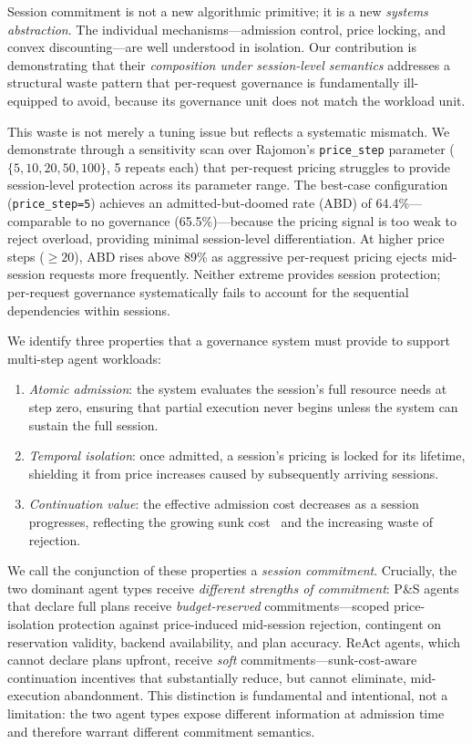\documentclass[sigconf,review,anonymous]{acmart}
\begin{document}
Session commitment is not a new algorithmic primitive; it is a new \emph{systems abstraction}. The individual mechanisms---admission control, price locking, and convex discounting---are well understood in isolation. Our contribution is demonstrating that their \emph{composition under session-level semantics} addresses a structural waste pattern that per-request governance is fundamentally ill-equipped to avoid, because its governance unit does not match the workload unit.


This waste is not merely a tuning issue but reflects a systematic mismatch. We demonstrate through a sensitivity scan over Rajomon's \texttt{price\_step} parameter ($\{5, 10, 20, 50, 100\}$, 5 repeats each) that per-request pricing struggles to provide session-level protection across its parameter range. The best-case configuration (\texttt{price\_step=5}) achieves an admitted-but-doomed rate (ABD) of 64.4\%---comparable to no governance (65.5\%)---because the pricing signal is too weak to reject overload, providing minimal session-level differentiation. At higher price steps (${\geq}20$), ABD rises above 89\% as aggressive per-request pricing ejects mid-session requests more frequently. Neither extreme provides session protection; per-request governance systematically fails to account for the sequential dependencies within sessions.


We identify three properties that a governance system must provide to support multi-step agent workloads:
\begin{enumerate}[nosep,leftmargin=*]
  \item \emph{Atomic admission}: the system evaluates the session's full resource needs at step zero, ensuring that partial execution never begins unless the system can sustain the full session.
  \item \emph{Temporal isolation}: once admitted, a session's pricing is locked for its lifetime, shielding it from price increases caused by subsequently arriving sessions.
  \item \emph{Continuation value}: the effective admission cost decreases as a session progresses, reflecting the growing sunk cost~\cite{sunkcost_econ} and the increasing waste of rejection.
\end{enumerate}
We call the conjunction of these properties a \emph{session commitment}. Crucially, the two dominant agent types receive \emph{different strengths of commitment}: P\&S agents that declare full plans receive \emph{budget-reserved} commitments---scoped price-isolation protection against price-induced mid-session rejection, contingent on reservation validity, backend availability, and plan accuracy. ReAct agents, which cannot declare plans upfront, receive \emph{soft} commitments---sunk-cost-aware continuation incentives that substantially reduce, but cannot eliminate, mid-execution abandonment. This distinction is fundamental and intentional, not a limitation: the two agent types expose different information at admission time and therefore warrant different commitment semantics.
\end{document}
